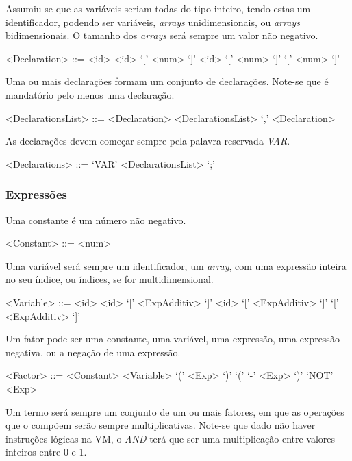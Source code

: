 Assumiu-se que as variáveis seriam todas do tipo inteiro, tendo estas um
identificador, podendo ser variáveis, \emph{arrays} unidimensionais, ou
\emph{arrays} bidimensionais. O tamanho dos \emph{arrays} será sempre um valor
não negativo.   

\begin{grammar}
<Declaration> ::= <id>
\alt <id> `[' <num> `]'
\alt <id> `[' <num> `]' `[' <num> `]' 
\end{grammar}

Uma ou mais declarações formam um conjunto de declarações. Note-se que
é mandatório pelo menos uma declaração.

\begin{grammar}
<DeclarationsList> ::= <Declaration> 
\alt <DeclarationsList> `,' <Declaration> 
\end{grammar}

As declarações devem começar sempre pela palavra reservada \emph{VAR}.

\begin{grammar}
<Declarations> ::= `VAR' <DeclarationsList> `;' 
\end{grammar}


\subsubsection{Expressões}
\label{subsec:subsubsec:expressoes:desenho}

Uma constante é um número não negativo.

\begin{grammar}
<Constant> ::= <num>
\end{grammar}

Uma variável será sempre um identificador, um \emph{array}, com uma expressão
inteira no seu índice, ou índices, se for multidimensional.

\begin{grammar}
<Variable> ::= <id>
\alt <id> `[' <ExpAdditiv> `]'
\alt <id> `[' <ExpAdditiv> `]' `[' <ExpAdditiv> `]' 
\end{grammar} 

Um fator pode ser uma constante, uma variável, uma expressão, uma expressão
negativa, ou a negação de uma expressão.
\begin{grammar}
<Factor> ::= <Constant>
\alt <Variable>
\alt `(' <Exp> `)'
\alt `(' `-' <Exp> `)'
\alt `NOT' <Exp>
\end{grammar}


Um termo será sempre um conjunto de um ou mais fatores, em que as operações que o compõem
serão sempre multiplicativas. Note-se que dado não haver instruções lógicas na
VM, o \emph{AND} terá que ser uma multiplicação entre valores inteiros entre
0 e 1. 

